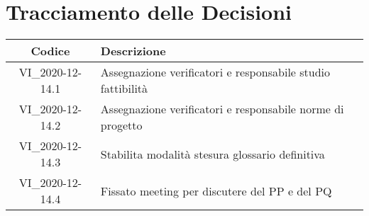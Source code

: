 \section*{Tracciamento delle Decisioni}

\begin{center}
	\begin{longtable}{|c|p{14.5cm}|}
	\hline
	\rowcolor{lighter-grayer}
	\textbf{Codice} & \textbf{Descrizione} \\
	\hline
	\endfirsthead

	\hline
	VI\_2020-12-14.1 & Assegnazione verificatori e responsabile studio fattibilità \\
	VI\_2020-12-14.2 & Assegnazione verificatori e responsabile norme di progetto\\
	VI\_2020-12-14.3 & Stabilita modalità stesura glossario definitiva \\
	VI\_2020-12-14.4 & Fissato meeting per discutere del PP e del PQ \\
	\hline

	\end{longtable}
\end{center}